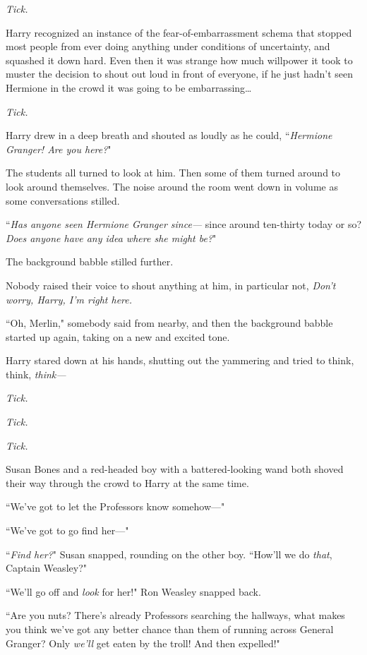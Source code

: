 \emph{Tick.}

Harry recognized an instance of the fear-of-embarrassment schema that stopped most people from ever doing anything under conditions of uncertainty, and squashed it down hard. Even then it was strange how much willpower it took to muster the decision to shout out loud in front of everyone, if he just hadn't seen Hermione in the crowd it was going to be embarrassing{\ldots}

\emph{Tick.}

Harry drew in a deep breath and shouted as loudly as he could, ``\emph{Hermione Granger! Are you here?}"

The students all turned to look at him. Then some of them turned around to look around themselves. The noise around the room went down in volume as some conversations stilled.

``\emph{Has anyone seen Hermione Granger since—} since around ten-thirty today or so? \emph{Does anyone have any idea where she might be?}"

The background babble stilled further.

Nobody raised their voice to shout anything at him, in particular not, \emph{Don't worry, Harry, I'm right here.}

``Oh, Merlin," somebody said from nearby, and then the background babble started up again, taking on a new and excited tone.

Harry stared down at his hands, shutting out the yammering and tried to think, think, \emph{think—}

\emph{Tick.}

\emph{Tick.}

\emph{Tick.}

Susan Bones and a red-headed boy with a battered-looking wand both shoved their way through the crowd to Harry at the same time.

``We've got to let the Professors know somehow—"

``We've got to go find her—"

``\emph{Find her?}" Susan snapped, rounding on the other boy. ``How'll we do \emph{that}, Captain Weasley?"

``We'll go off and \emph{look} for her!" Ron Weasley snapped back.

``Are you nuts? There's already Professors searching the hallways, what makes you think we've got any better chance than them of running across General Granger? Only \emph{we'll} get eaten by the troll! And then expelled!"

